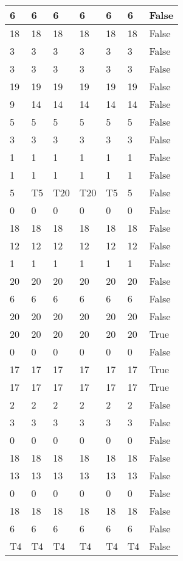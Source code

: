 \begin{longtable}[htbp]{| p{} | p{} | p{}| p{}| p{}| p{}| p{}|}
6 & 6 & 6 & 6 & 6 & 6 & False \\ \hline
18 & 18 & 18 & 18 & 18 & 18 & False \\ \hline
3 & 3 & 3 & 3 & 3 & 3 & False \\ \hline
3 & 3 & 3 & 3 & 3 & 3 & False \\ \hline
19 & 19 & 19 & 19 & 19 & 19 & False \\ \hline
9 & 14 & 14 & 14 & 14 & 14 & False \\ \hline
5 & 5 & 5 & 5 & 5 & 5 & False \\ \hline
3 & 3 & 3 & 3 & 3 & 3 & False \\ \hline
1 & 1 & 1 & 1 & 1 & 1 & False \\ \hline
1 & 1 & 1 & 1 & 1 & 1 & False \\ \hline
5 & \multicolumn{1}{l|}{T5} & \multicolumn{1}{l|}{T20} & \multicolumn{1}{l|}{T20} & \multicolumn{1}{l|}{T5} & 5 & False \\ \hline
0 & 0 & 0 & 0 & 0 & 0 & False \\ \hline
18 & 18 & 18 & 18 & 18 & 18 & False \\ \hline
12 & 12 & 12 & 12 & 12 & 12 & False \\ \hline
1 & 1 & 1 & 1 & 1 & 1 & False \\ \hline
20 & 20 & 20 & 20 & 20 & 20 & False \\ \hline
6 & 6 & 6 & 6 & 6 & 6 & False \\ \hline
20 & 20 & 20 & 20 & 20 & 20 & False \\ \hline
20 & 20 & 20 & 20 & 20 & 20 & True \\ \hline
0 & 0 & 0 & 0 & 0 & 0 & False \\ \hline
17 & 17 & 17 & 17 & 17 & 17 & True \\ \hline
17 & 17 & 17 & 17 & 17 & 17 & True \\ \hline
2 & 2 & 2 & 2 & 2 & 2 & False \\ \hline
3 & 3 & 3 & 3 & 3 & 3 & False \\ \hline
0 & 0 & 0 & 0 & 0 & 0 & False \\ \hline
18 & 18 & 18 & 18 & 18 & 18 & False \\ \hline
13 & 13 & 13 & 13 & 13 & 13 & False \\ \hline
0 & 0 & 0 & 0 & 0 & 0 & False \\ \hline
18 & 18 & 18 & 18 & 18 & 18 & False \\ \hline
6 & 6 & 6 & 6 & 6 & 6 & False \\ \hline
\multicolumn{1}{|l|}{T4} & \multicolumn{1}{l|}{T4} & \multicolumn{1}{l|}{T4} & \multicolumn{1}{l|}{T4} & \multicolumn{1}{l|}{T4} & \multicolumn{1}{l|}{T4} & False \\ \hline

\end{longtable}

